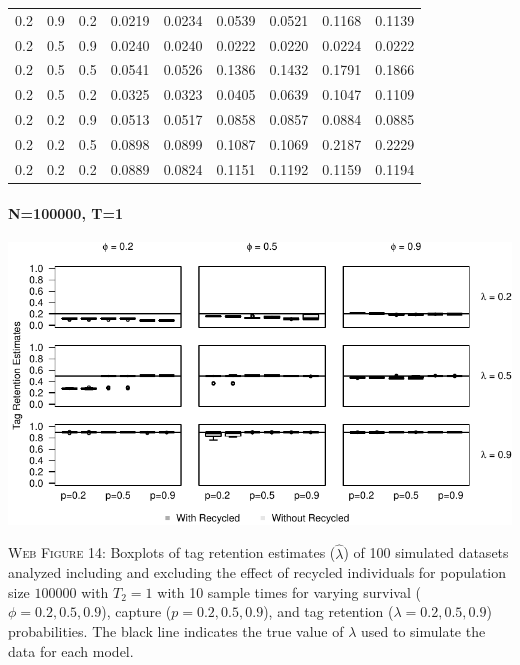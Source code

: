 \documentclass[]{article}
\let\oldparagraph\paragraph
\renewcommand{\paragraph}[1]{\oldparagraph{#1}\mbox{}}
\begin{document}
\begin{table}[ht]
{\begin{tabular}{rrrrrrrrr}
  0.2 & 0.9 & 0.2 & 0.0219 & 0.0234 & 0.0539 & 0.0521 & 0.1168 & 0.1139 \\ 
  0.2 & 0.5 & 0.9 & 0.0240 & 0.0240 & 0.0222 & 0.0220 & 0.0224 & 0.0222 \\ 
  0.2 & 0.5 & 0.5 & 0.0541 & 0.0526 & 0.1386 & 0.1432 & 0.1791 & 0.1866 \\ 
  0.2 & 0.5 & 0.2 & 0.0325 & 0.0323 & 0.0405 & 0.0639 & 0.1047 & 0.1109 \\ 
  0.2 & 0.2 & 0.9 & 0.0513 & 0.0517 & 0.0858 & 0.0857 & 0.0884 & 0.0885 \\ 
  0.2 & 0.2 & 0.5 & 0.0898 & 0.0899 & 0.1087 & 0.1069 & 0.2187 & 0.2229 \\ 
  0.2 & 0.2 & 0.2 & 0.0889 & 0.0824 & 0.1151 & 0.1192 & 0.1159 & 0.1194 \\ 
   \hline
\end{tabular}
}
\endgroup
\end{table}

\newpage

\paragraph{N=100000, T=1}\label{n100000-t1-2}

\includegraphics{Appendix_BW_files/figure-latex/figure14_tagretention_GJSTL2-1.pdf}

\textsc{Web Figure 14:} Boxplots of tag retention estimates
(\(\hat{\lambda}\)) of 100 simulated datasets analyzed including and excluding
the effect of recycled individuals for population size \(100000\) with
\(T_2=1\) with 10 sample times for varying survival
(\(\phi=0.2,0.5,0.9\)), capture (\(p=0.2,0.5,0.9\)), and tag retention
(\(\lambda=0.2,0.5,0.9\)) probabilities. The black line indicates the
true value of \(\lambda\) used to simulate the data for each model.
\end{document}
